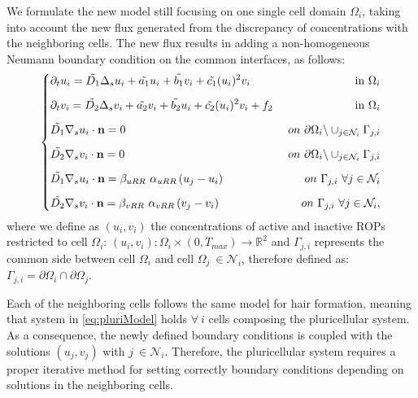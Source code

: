We formulate the new model still focusing on one single cell domain $\Omega_i$, taking into account the new flux generated from the discrepancy of concentrations with the neighboring cells. The new flux results in adding a non-homogeneous Neumann boundary condition on the common interfaces, as follows:
\begin{equation} \label{eq:pluriModel}
\left\lbrace
\begin{matrix}
  \begin{aligned}
    & \partial_t u_i = \Tilde{D_1} \Delta_s u_i + \Tilde{a_1} u_i + \Tilde{b_1} v_i + \Tilde{c_1} (u_i)^2 v_i & \ \text{in} \ \Omega_i\\[6pt]
    & \partial_t v_i = \Tilde{D_2} \Delta_s v_i + \Tilde{a_2} v_i + \Tilde{b_2} u_i + \Tilde{c_2} (u_i)^2 v_i + f_2 & \ \text{in} \ \Omega_i \\[6pt]
    & \Tilde{D_1} \nabla_s u_i \cdot \mathbf{n} = 0 & \ on \ \partial \Omega_i \backslash \cup_{j \in \mathcal{N}_i} \Gamma_{j,i} \\[6pt]
    & \Tilde{D_2} \nabla_s v_i \cdot \mathbf{n} = 0 & \ on \ \partial \Omega_i \backslash \cup_{j \in \mathcal{N}_i} \Gamma_{j,i} \\[6pt]
    & \Tilde{D_1} \nabla_s u_i \cdot \mathbf{n} = \beta_{uRR} \ \alpha_{uRR} \left(u_j - u_i \right) & \ on \ \Gamma_{j,i} \ \forall j \in  \mathcal{N}_i \\[6pt]
    & \Tilde{D_2} \nabla_s v_i \cdot \mathbf{n} = \beta_{vRR} \ \alpha_{vRR} \left(v_j - v_i \right) & \ on \ \Gamma_{j,i}\ \forall j \in  \mathcal{N}_i ,
  \end{aligned}
\end{matrix}
\right.
\end{equation}
where we define as $(u_i, v_i)$ the concentrations of active and inactive ROPs restricted to cell $\Omega_i$: $(u_i, v_i): \Omega_i \times \left(0, T_{max} \right) \longrightarrow \mathds{R}^2$ and $\Gamma_{j,i}$ represents the common side between cell $\Omega_i$ and cell $\Omega_j \ \in \mathcal{N}_i $, therefore defined as: $\Gamma_{j,i} = \partial \Omega_i \cap \partial \Omega_j$.

Each of the neighboring cells follows the same model for hair formation, meaning that system in \eqref{eq:pluriModel} holds $\forall \ i$ cells composing the pluricellular system. As a consequence, the newly defined boundary conditions is coupled with the solutions $(u_j, v_j)$ with $j \ \in \mathcal{N}_i$. Therefore, the pluricellular system requires a proper iterative method for setting correctly boundary conditions depending on solutions in the neighboring cells.

